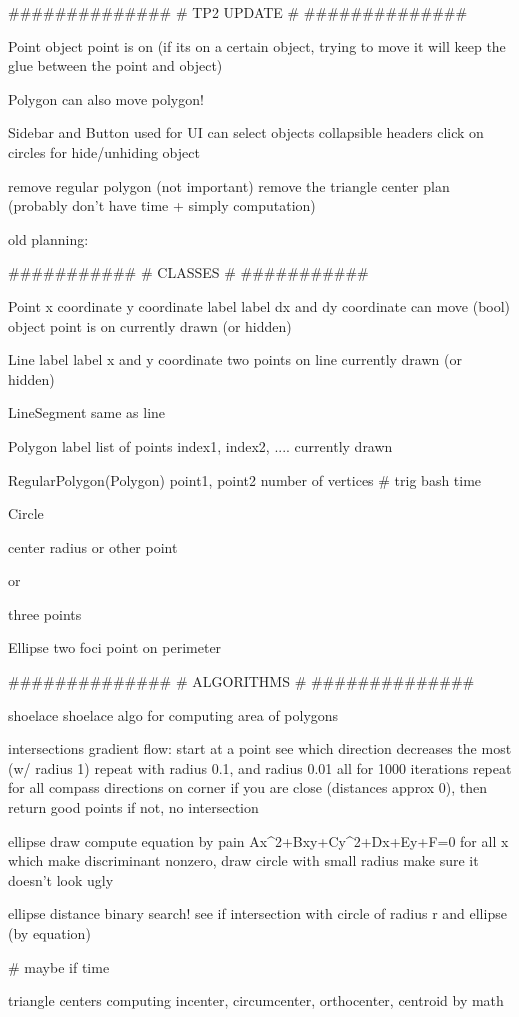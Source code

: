 ##############
# TP2 UPDATE #
##############

Point {
    object point is on (if its on a certain object, trying to move it will
    keep the glue between the point and object)
}

Polygon {
    can also move polygon!
}

Sidebar and Button {
    used for UI
    can select objects
    collapsible headers
    click on circles for hide/unhiding object
}

remove regular polygon (not important)
remove the triangle center plan (probably don't have time + simply computation)


old planning:

###########
# CLASSES #
###########

Point {
    x coordinate
    y coordinate
    label
    label dx and dy coordinate
    can move (bool)
    object point is on
    currently drawn (or hidden)
}

Line {
    label
    label x and y coordinate
    two points on line
    currently drawn (or hidden)
}

LineSegment {
    same as line
}

Polygon {
    label
    list of points
    index1, index2, ....
    currently drawn
}

RegularPolygon(Polygon) {
    point1, point2
    number of vertices
    # trig bash time
}

Circle {
    center
    radius or other point

    or

    three points
}

Ellipse {
    two foci
    point on perimeter
}

##############
# ALGORITHMS #
##############

shoelace {
    shoelace algo for computing area of polygons
}

intersections {
    gradient flow: 
    start at a point
    see which direction decreases the most (w/ radius 1)
    repeat with radius 0.1, and radius 0.01
    all for 1000 iterations
    repeat for all compass directions on corner
    if you are close (distances approx 0), then return good points
    if not, no intersection
}

ellipse draw {
    compute equation by pain
    Ax^2+Bxy+Cy^2+Dx+Ey+F=0
    for all x which make discriminant nonzero, draw circle with small radius
    make sure it doesn't look ugly
}

ellipse distance {
    binary search!
    see if intersection with circle of radius r and ellipse (by equation)
}

# maybe if time

triangle centers {
    computing incenter, circumcenter, orthocenter, centroid by math
}